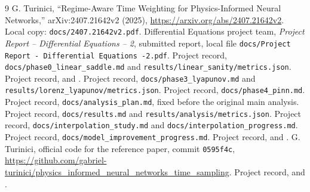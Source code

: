 \documentclass[11pt,a4paper]{article}
\begin{document}
\begin{thebibliography}{9}
 G. Turinici, ``Regime-Aware Time Weighting for Physics-Informed Neural Networks,'' arXiv:2407.21642v2 (2025), \url{https://arxiv.org/abs/2407.21642v2}. Local copy: \texttt{docs/2407.21642v2.pdf}.
 Differential Equations project team, \emph{Project Report -- Differential Equations -- 2}, submitted report, local file \texttt{docs/Project Report - Differential Equations -2.pdf}.
 Project record, \texttt{docs/phase0\_linear\_saddle.md} and \texttt{results/linear\_sanity/metrics.json}.
 Project record,  and .
 Project record, \texttt{docs/phase3\_lyapunov.md} and \texttt{results/lorenz\_lyapunov/metrics.json}.
 Project record, \texttt{docs/phase4\_pinn.md}.
 Project record, \texttt{docs/analysis\_plan.md}, fixed before the original main analysis.
 Project record, \texttt{docs/results.md} and \texttt{results/analysis/metrics.json}.
 Project record, \texttt{docs/interpolation\_study.md} and \texttt{docs/interpolation\_progress.md}.
 Project record, \texttt{docs/model\_improvement\_progress.md}.
 Project record,  and .
 G. Turinici, official code for the reference paper, commit \texttt{0595f4c}, \url{https://github.com/gabriel-turinici/physics_informed_neural_networks_time_sampling}.
 Project record,  and .
\end{thebibliography}
\end{document}

